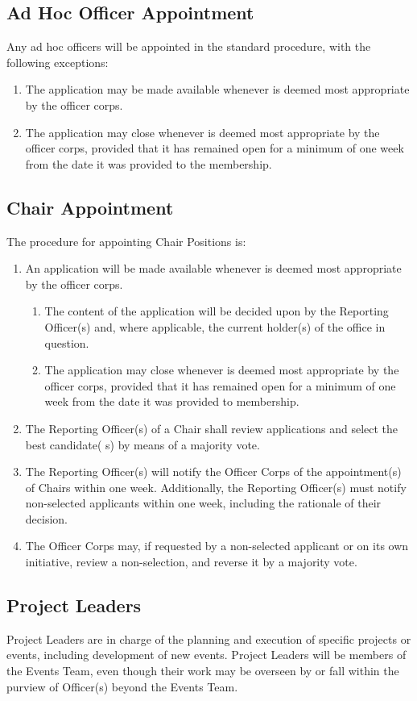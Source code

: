 \subsection{Ad Hoc Officer Appointment} \label{IV.5}

Any ad hoc officers will be appointed
in the standard procedure, with the following exceptions:
\begin{enumerate}
    \item The application may be made available whenever is deemed most appropriate by the
officer corps.
    \item The application may close whenever is deemed most appropriate by the officer corps,
provided that it has remained open for a minimum of one week from the date it was
provided to the membership.
\end{enumerate}


\subsection{Chair Appointment} \label{IV.6}

The procedure for appointing Chair Positions is:
\begin{enumerate}
    \item An application will be made available whenever is deemed most appropriate by the
officer corps.
    \begin{enumerate}
        \item The content of the application will be decided upon by the Reporting Officer(s)
and, where applicable, the current holder(s) of the office in question.
        \item The application may close whenever is deemed most appropriate by the officer
corps, provided that it has remained open for a minimum of one week from the
date it was provided to membership.
    \end{enumerate}
    \item The Reporting Officer(s) of a Chair shall review applications and select the best candidate(
s) by means of a majority vote.
    \item The Reporting Officer(s) will notify the Officer Corps of the appointment(s) of Chairs
within one week. Additionally, the Reporting Officer(s) must notify non-selected
applicants within one week, including the rationale of their decision.
    \item The Officer Corps may, if requested by a non-selected applicant or on its own initiative,
review a non-selection, and reverse it by a majority vote.
\end{enumerate}


\subsection{Project Leaders} \label{IV.7}

Project Leaders are in charge of the planning and execution
of specific projects or events, including development of new events. Project Leaders
will be members of the Events Team, even though their work may be overseen by or fall
within the purview of Officer(s) beyond the Events Team.